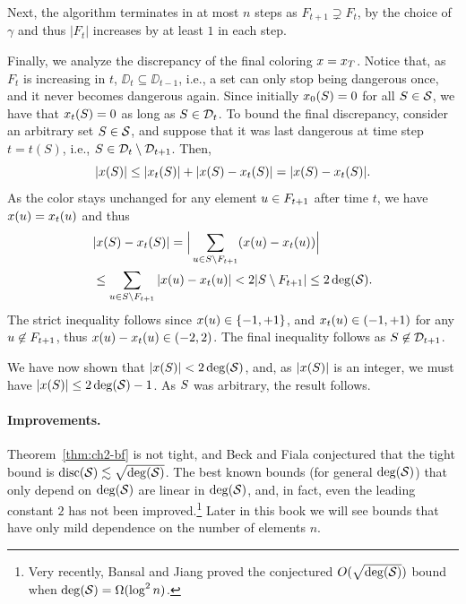 Next, the algorithm terminates in at most $n$ steps as $F_{t+1} \supsetneq F_{t}$, by the choice of $\gamma$ and thus $|F_t|$ increases by at least $1$ in each step. 

Finally, we analyze the discrepancy of the final coloring $x = x_T$. Notice that, as $F_t$ is increasing in $t$, \(\DD_{t} \subseteq \DD_{t-1}\), i.e., a set can only stop being dangerous once, and it never becomes dangerous again. Since initially $x_0(S) = 0$ for all $S \in \mathcal{S}$, we have that \(x_t(S) = 0\) as long as \(S \in \mathcal{D}_t\). 
To bound the final discrepancy, consider an arbitrary set \(S \in \mathcal{S}\), and suppose that it was last dangerous at time step \(t=t(S)\), i.e., \(S \in \mathcal{D}_{t} \setminus \mathcal{D}_{t+1}\). Then,
\[
    |x(S)| \le |x_{t}(S)| + |x(S) - x_{t}(S)|
    = |x(S) - x_{t}(S)|.
\]
As the color stays unchanged for any element \(u \in F_{t+1}\) after time $t$, we have \(x(u) = x_t(u)\) and thus 
\begin{align*}
    & |x(S) - x_{t}(S)|
    =
    \Big|\sum_{u \in S \setminus F_{t+1}} (x(u) -  x_t(u))\Big|\\
    &\le \sum_{u \in S \setminus F_{t+1}} |x(u) -  x_t(u)| < 2|S \setminus F_{t+1}| \le 2 \operatorname{deg}(\mathcal{S}).
\end{align*}
The strict inequality follows since \(x(u) \in \{-1,+1\}\), and \(x_t(u) \in (-1, +1)\) for any \(u \not\in F_{t+1}\), thus \(x(u) - x_t(u) \in (-2, 2)\). The final inequality follows as \(S \not \in \mathcal{D}_{t+1}\). 

We have now shown that \(|x(S)| < 2 \operatorname{deg}(\mathcal{S})\), and, as \(|x(S)|\) is an integer,  we must have \(|x(S)| \le 2 \operatorname{deg}(\mathcal{S})-1\). As \(S\) was arbitrary, the result follows.


\paragraph{Improvements.} Theorem~\ref{thm:ch2-bf} is not tight, and Beck and Fiala
conjectured that the tight bound is \(\operatorname{disc}(\mathcal{S}) \lesssim
\sqrt{\operatorname{deg}(\mathcal{S})}\). The best known bounds (for general \(\operatorname{deg}(\mathcal{S})\))  that only depend on
\(\operatorname{deg}(\mathcal{S})\) are linear in \(\operatorname{deg}(\mathcal{S})\), and, in fact, even the leading
constant \(2\) has not been improved.\footnote{Very recently, Bansal and Jiang \cite{bansaljiang2025} proved the conjectured $O(\sqrt{\operatorname{deg}(\mathcal{S})})$ bound when $\operatorname{deg}(\mathcal{S}) = \Omega(\log^2 n)$.} Later in this book we will see
bounds that have only mild dependence on the number of elements
\(n\). 

